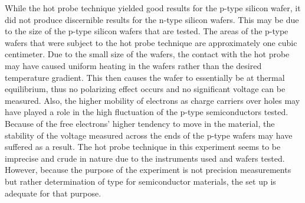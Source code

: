 While the hot probe technique yielded good results for the p-type silicon wafer, it did not produce discernible results for the n-type silicon wafers. This may be due to the size of the p-type silicon wafers that are tested. The areas of the p-type wafers that were subject to the hot probe technique are approximately one cubic centimeter. Due to the small size of the wafers, the contact with the hot probe may have caused uniform heating in the wafers rather than the desired temperature gradient. This then causes the wafer to essentially be at thermal equilibrium, thus no polarizing effect occurs and no significant voltage can be measured. Also, the higher mobility of electrons as charge carriers over holes may have played a role in the high fluctuation of the p-type semiconductors tested. Because of the free electrons' higher tendency to move in the material, the stability of the voltage measured across the ends of the p-type wafers may have suffered as a result. The hot probe technique in this experiment seems to be imprecise and crude in nature due to the instruments used and wafers tested. However, because the purpose of the experiment is not precision measurements but rather determination of type for semiconductor materials, the set up is adequate for that purpose.
